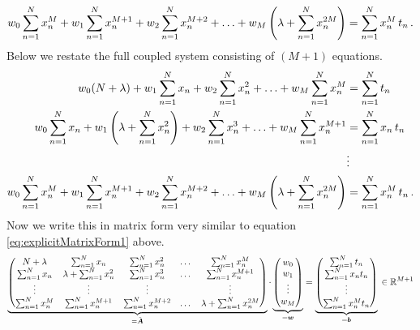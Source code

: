 \documentclass[11pt, DINA4, fleqn]{amsart}
\def\vw{\boldsymbol{w}\xspace}
\def\vb{\boldsymbol{b}\xspace}
\def\mA{\boldsymbol{A}\xspace}
\begin{document}
\begin{align}
w_0 \sum \displaylimits_{n = 1}^{N} x_n^M 
+ w_1 \sum \displaylimits_{n = 1}^{N} x_n^{M + 1} 
+ w_2 \sum \displaylimits_{n = 1}^{N} x_n^{M + 2} 
+ \dotsc 
+ w_M \left( \lambda + \sum \displaylimits_{n = 1}^{N} x_n^{2M} \right)
 = \sum \displaylimits_{n = 1}^{N} x_n^M \, t_n \, .
\end{align}
Below we restate the full coupled system consisting of $(M+1)$ equations.
\begin{align}
w_0 (N + \lambda) + w_1 \sum \displaylimits_{n = 1}^{N} x_n 
+ w_2 \sum \displaylimits_{n = 1}^{N} x_n^2 + \dotsc 
+ w_M \sum \displaylimits_{n = 1}^{N} x_n^M &= \sum \displaylimits_{n = 1}^{N} t_n \\
w_0 \sum \displaylimits_{n = 1}^{N} x_n 
+ w_1 \left( \lambda + \sum \displaylimits_{n = 1}^{N} x_n^2 \right) 
+ w_2 \sum \displaylimits_{n = 1}^{N} x_n^3 + \dotsc 
+ w_M \sum \displaylimits_{n = 1}^{N} x_n^{M + 1} &= \sum \displaylimits_{n = 1}^{N} x_n \, t_n \\
&\vdots \\
w_0 \sum \displaylimits_{n = 1}^{N} x_n^M 
+ w_1 \sum \displaylimits_{n = 1}^{N} x_n^{M + 1} 
+ w_2 \sum \displaylimits_{n = 1}^{N} x_n^{M + 2} 
+ \dotsc 
+ w_M \left( \lambda + \sum \displaylimits_{n = 1}^{N} x_n^{2M} \right)
&= \sum \displaylimits_{n = 1}^{N} x_n^M \, t_n \, .
\end{align}
Now we write this in matrix form very similar to equation \eqref{eq:explicitMatrixForm1} above.
\begin{align}
\underbrace{
	\begin{pmatrix}
	N + \lambda& \sum\displaylimits_{n = 1}^{N}x_n & \sum\displaylimits_{n = 1}^{N}x_n^2 & \dots & \sum\displaylimits_{n = 1}^{N}x_n^M \\
	\sum\displaylimits_{n = 1}^{N}x_n & \lambda + \sum\displaylimits_{n = 1}^{N}x_n^2 &
	\sum\displaylimits_{n = 1}^{N}x_n^3 & \dots &
	\sum\displaylimits_{n = 1}^{N}x_n^{M + 1} \\
	\vdots & \vdots & \vdots && \vdots \\ 
	\sum\displaylimits_{n = 1}^{N}x_n^M &
	\sum\displaylimits_{n = 1}^{N}x_n^{M+1} &
	\sum\displaylimits_{n = 1}^{N}x_n^{M+2} &
	\dotsc &  \lambda + \sum\displaylimits_{n = 1}^{N}x_n^{2M}
	\end{pmatrix}}_{=\tilde{\mA}} \cdot
\underbrace{\begin{pmatrix}
	w_0 \\ w_1 \\ \vdots \\ w_M
	\end{pmatrix}}_{=\vw}
=
\underbrace{\begin{pmatrix}
	\sum\displaylimits_{n = 1}^{N} t_n \\
	\sum\displaylimits_{n = 1}^{N} x_n t_n \\
	\vdots \\
	\sum\displaylimits_{n = 1}^{N} x_n^M t_n 
	\end{pmatrix}}_{=\vb} \, \in \mathbb{R}^{M+1}
\label{eq:explicitMatrixForm1}
\end{align}
\end{document}

